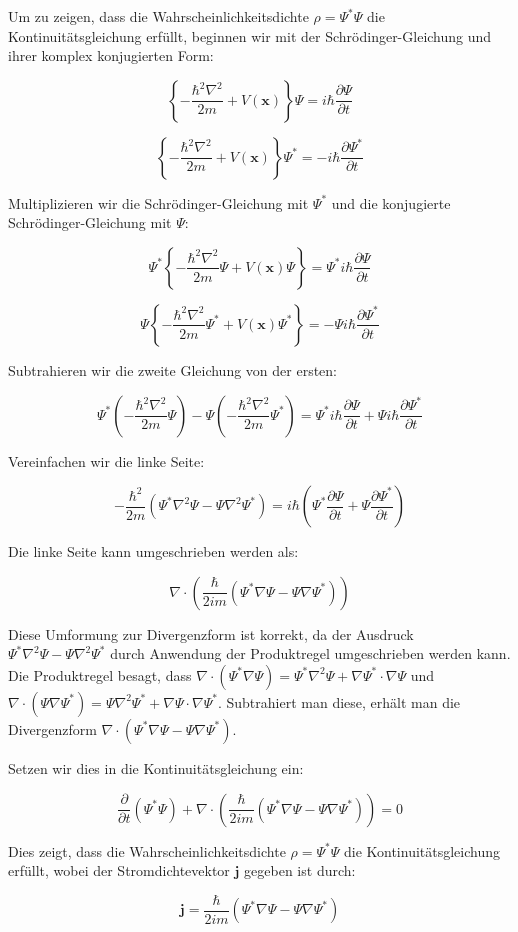 Um zu zeigen, dass die Wahrscheinlichkeitsdichte \(\rho = \Psi^* \Psi\) die Kontinuitätsgleichung erfüllt, beginnen wir mit der Schrödinger-Gleichung und ihrer komplex konjugierten Form:

\[
\left\{-\frac{\hbar^2 \nabla^2}{2 m} + V(\mathbf{x})\right\} \Psi = i \hbar \frac{\partial \Psi}{\partial t}
\]

\[
\left\{-\frac{\hbar^2 \nabla^2}{2 m} + V(\mathbf{x})\right\} \Psi^* = -i \hbar \frac{\partial \Psi^*}{\partial t}
\]

Multiplizieren wir die Schrödinger-Gleichung mit \(\Psi^*\) und die konjugierte Schrödinger-Gleichung mit \(\Psi\):

\[
\Psi^* \left\{-\frac{\hbar^2 \nabla^2}{2 m} \Psi + V(\mathbf{x}) \Psi\right\} = \Psi^* i \hbar \frac{\partial \Psi}{\partial t}
\]

\[
\Psi \left\{-\frac{\hbar^2 \nabla^2}{2 m} \Psi^* + V(\mathbf{x}) \Psi^*\right\} = -\Psi i \hbar \frac{\partial \Psi^*}{\partial t}
\]

Subtrahieren wir die zweite Gleichung von der ersten:

\[
\Psi^* \left(-\frac{\hbar^2 \nabla^2}{2 m} \Psi\right) - \Psi \left(-\frac{\hbar^2 \nabla^2}{2 m} \Psi^*\right) = \Psi^* i \hbar \frac{\partial \Psi}{\partial t} + \Psi i \hbar \frac{\partial \Psi^*}{\partial t}
\]

Vereinfachen wir die linke Seite:

\[
-\frac{\hbar^2}{2 m} \left(\Psi^* \nabla^2 \Psi - \Psi \nabla^2 \Psi^*\right) = i \hbar \left(\Psi^* \frac{\partial \Psi}{\partial t} + \Psi \frac{\partial \Psi^*}{\partial t}\right)
\]

Die linke Seite kann umgeschrieben werden als:

\[
\nabla \cdot \left(\frac{\hbar}{2 i m} \left(\Psi^* \nabla \Psi - \Psi \nabla \Psi^*\right)\right)
\]

Diese Umformung zur Divergenzform ist korrekt, da der Ausdruck \(\Psi^* \nabla^2 \Psi - \Psi \nabla^2 \Psi^*\) durch Anwendung der Produktregel umgeschrieben werden kann. Die Produktregel besagt, dass \(\nabla \cdot (\Psi^* \nabla \Psi) = \Psi^* \nabla^2 \Psi + \nabla \Psi^* \cdot \nabla \Psi\) und \(\nabla \cdot (\Psi \nabla \Psi^*) = \Psi \nabla^2 \Psi^* + \nabla \Psi \cdot \nabla \Psi^*\). Subtrahiert man diese, erhält man die Divergenzform \(\nabla \cdot (\Psi^* \nabla \Psi - \Psi \nabla \Psi^*)\).

Setzen wir dies in die Kontinuitätsgleichung ein:

\[
\frac{\partial}{\partial t} (\Psi^* \Psi) + \nabla \cdot \left(\frac{\hbar}{2 i m} \left(\Psi^* \nabla \Psi - \Psi \nabla \Psi^*\right)\right) = 0
\]

Dies zeigt, dass die Wahrscheinlichkeitsdichte \(\rho = \Psi^* \Psi\) die Kontinuitätsgleichung erfüllt, wobei der Stromdichtevektor \(\mathbf{j}\) gegeben ist durch:

\[
\mathbf{j} = \frac{\hbar}{2 i m} \left(\Psi^* \nabla \Psi - \Psi \nabla \Psi^*\right)
\]